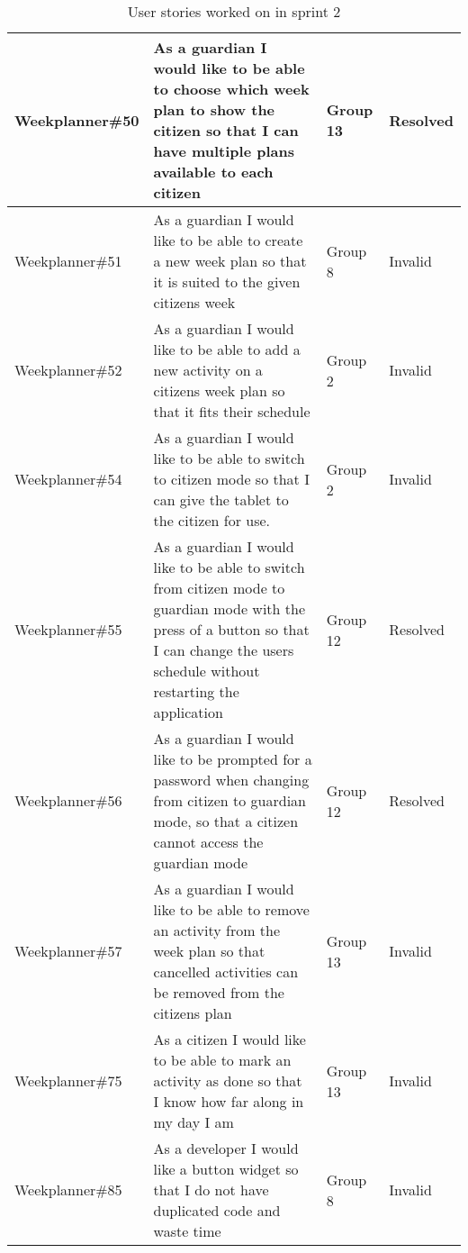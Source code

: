\begin{table}[!ht]
\begin{tabular}{|p{2.8cm}|p{7cm}|p{1.5cm}|p{1.5cm}|}
    Weekplanner\#50 & As a guardian I would like to be able to choose which week plan to show the citizen so that I can have multiple plans available to each citizen                                          & Group 13        & Resolved\\ \hline
    Weekplanner\#51 & As a guardian I would like to be able to create a new week plan so that it is suited to the given citizens week                                                                          & Group 8         & Invalid    \\ \hline
    Weekplanner\#52 & As a guardian I would like to be able to add a new activity on a citizens week plan so that it fits their schedule                                                                       & Group 2         & Invalid    \\ \hline
    Weekplanner\#54 & As a guardian I would like to be able to switch to citizen mode so that I can give the tablet to the citizen for use.                                                                    & Group 2         & Invalid    \\ \hline
    Weekplanner\#55 & As a guardian I would like to be able to switch from citizen mode to guardian mode with the press of a button so that I can change the users schedule without restarting the application & Group 12        & Resolved    \\ \hline
    Weekplanner\#56 & As a guardian I would like to be prompted for a password when changing from citizen to guardian mode, so that a citizen cannot access the guardian mode                                  & Group 12        & Resolved    \\ \hline
    Weekplanner\#57 & As a guardian I would like to be able to remove an activity from the week plan so that cancelled activities can be removed from the citizens plan                                        & Group 13        & Invalid    \\ \hline
    Weekplanner\#75 & As a citizen I would like to be able to mark an activity as done so that I know how far along in my day I am                                                                             & Group 13        & Invalid    \\ \hline
    Weekplanner\#85 & As a developer I would like a button widget so that I do not have duplicated code and waste time                                                                                         & Group 8         & Invalid    \\ \hline
    \end{tabular}
    \caption{User stories worked on in sprint 2}
\end{table}